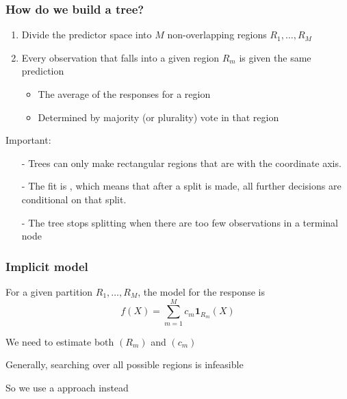\documentclass[12pt]{beamer}
\begin{document}
%




\begin{frame}[fragile]
\frametitle{How do we build a tree?}

\begin{enumerate}
\item Divide the predictor space into
$M$ non-overlapping regions $R_1, \ldots, R_M$ 

\item Every observation that falls into a given region $R_m$ is given the same prediction
\begin{itemize}
\item {} The average of the responses for a region
\item {} Determined by majority (or plurality) vote in that region
\end{itemize}
\end{enumerate}
\vsp

Important:
\begin{itemize}
\item[-] Trees can only make rectangular regions that are  with the coordinate axis.
\item[-] The fit is , which means that after a split is made, all further decisions are conditional
on that split.
\item[-] The tree stops splitting when there are too few observations in a terminal node
\end{itemize}
\end{frame}



\begin{frame}[fragile]
\frametitle{Implicit model}
For a given partition $R_1, \ldots, R_M$, the model for the response is
\[
f(X) = \sum_{m = 1}^M c_m \mathbf{1}_{R_m}(X)
\]

\vsp
We need to estimate both $(R_m)$ and $(c_m)$

\vsp
Generally, searching over all possible regions is infeasible


So we use a 
 approach instead

\end{frame}
\end{document}

